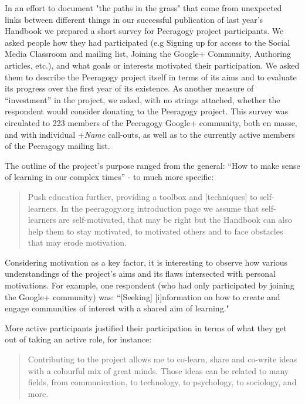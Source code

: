 \documentclass{acm_proc_article-sp}
\begin{document}
In an effort to document "the paths in the grass" \cite{Wall} that come from unexpected links between different things in our successful publication of last year's Handbook we prepared a short survey for Peeragogy project participants. We asked people how they had participated (e.g Signing up for access to the Social Media Classroom and mailing list, Joining the Google+ Community, Authoring articles, etc.), and what goals or interests motivated their participation. We asked them to describe the Peeragogy project itself in terms of its aims and to evaluate its progress over the first year of its existence. As another measure of ``investment'' in the project, we asked, with no strings attached, whether the respondent would consider donating to the Peeragogy project. This survey was circulated to 223 members of the Peeragogy Google+ community, both en masse, and with individual +{\sl Name} call-outs, as well as to the currently active members of the Peeragogy mailing list.

The outline of the project's purpose ranged from the general: ``How to
make sense of learning in our complex times'' - to much more
specific:

\begin{quote}
Push education further, providing a toolbox and [techniques] to
self-learners. In the peeragogy.org introduction page we assume that
self-learners are self-motivated, that may be right but the Handbook
can also help them to stay motivated, to motivated others and to face
obstacles that may erode motivation.
\end{quote}

Considering motivation as a key factor, it is interesting to observe
how various understandings of the project's aims and its flaws
intersected with personal motivations. For example, one respondent
(who had only participated by joining the Google+ community) was:
``[Seeking] [i]nformation on how to create and engage communities of
interest with a shared aim of learning."

More active participants justified their participation in terms of what they get out of taking an active role, for instance:

\begin{quote}
Contributing to the project allows me to co-learn, share and co-write ideas with a colourful mix of great minds. Those ideas can be related to many fields, from communication, to technology, to psychology, to sociology, and more.
\end{quote}
\end{document}
